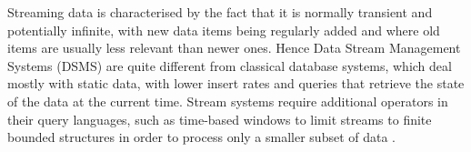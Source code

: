 Streaming data is characterised by the fact that it is normally transient and potentially infinite, with new data items
being regularly added and where old items are usually less relevant than newer ones. Hence Data Stream Management
Systems (DSMS) are quite different from classical database systems, which deal mostly with static data, with lower
insert rates and queries that retrieve the state of the data at the current time. Stream systems require additional
operators in their query languages, such as time-based windows to limit streams to finite bounded structures in order
to process only a smaller subset of data \cite{Arasu_2006,Brenninkmeijer_08}.


